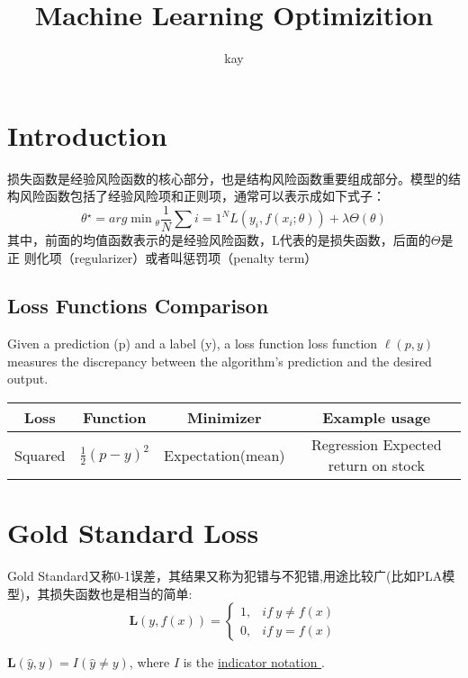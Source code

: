 \documentclass[hyperref, UTF-8]{ctexart}
\author{kay}
\title{Machine Learning Optimizition}
\begin{document}
\maketitle
\tableofcontents

\section{Introduction}

损失函数是经验风险函数的核心部分，也是结构风险函数重要组成部分。模型的结构风险函数包括了经验风险项和正则项，通常可以表示成如下式子：
\begin{displaymath}
  \theta{^\star} = arg \min{_\theta} \frac{1}{N}\sum{i=1}^N \mathit{L} (y_i,
  f(x_i; \theta)) + \lambda \Theta(\theta)
\end{displaymath}
其中，前面的均值函数表示的是经验风险函数，L代表的是损失函数，后面的$\Theta$是正
则化项（regularizer）或者叫惩罚项（penalty term）

\subsection{Loss Functions Comparison}
Given a prediction (p) and a label (y), a loss function loss function
$\ell(p,y)$ measures the discrepancy between the algorithm's prediction and the
desired output.   \\
\begin{tabular}{|c|c|c|c|}
  \hline
  Loss & Function & Minimizer & Example usage \\ \hline
  Squared & $\frac{1}{2}(p-y)^2$ & Expectation(mean) & Regression Expected return on stock \\  \hline
\end{tabular}

\section{Gold Standard Loss}
Gold Standard又称0-1误差，其结果又称为犯错与不犯错,用途比较广(比如PLA模型)，其损失函数也是相当的简单:
\begin{displaymath}
  \mathbf{L}(y, f(x)) = \left \{
      \begin{array}{ll}
        1, & if ~ y\neq f(x) \\
        0, &  if ~ y = f(x) 
      \end{array}  \right.
\end{displaymath}

$\mathbf{L}(\hat{y}, y) = \mathit{I}(\hat{y} \neq y)$, where $\mathit{I}$ is the
\href{https://en.wikipedia.org/wiki/Indicator_function}{ indicator notation }\cite{loss}.
\end{document}
